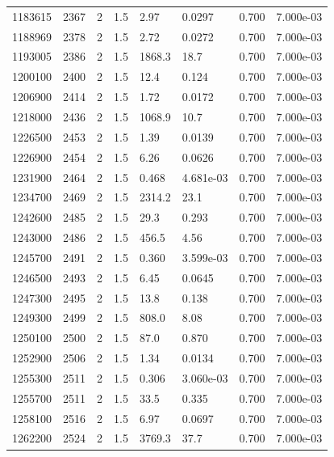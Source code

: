 \documentclass[preview]{standalone}
\begin{document}
{{{{{{{{{{{{{{{{\begin{tabular}{L{1.2cm}C{1.2cm} C{0.3cm}C{0.5cm} C{1.4cm}C{1.4cm} C{1.4cm}C{1.4cm}}
  1183615  &  2367  & 2     & 1.5 &  2.97  & 0.0297  & 0.700 &  7.000e-03   \\ 
  1188969  &  2378  & 2     & 1.5 &  2.72  & 0.0272  & 0.700 &  7.000e-03   \\ 
  1193005  &  2386  & 2     & 1.5 &  1868.3  & 18.7  & 0.700 &  7.000e-03   \\ 
  1200100  &  2400  & 2     & 1.5 &  12.4  & 0.124  & 0.700 &  7.000e-03   \\ 
  1206900  &  2414  & 2     & 1.5 &  1.72  & 0.0172  & 0.700 &  7.000e-03   \\ 
  1218000  &  2436  & 2     & 1.5 &  1068.9  & 10.7  & 0.700 &  7.000e-03   \\ 
  1226500  &  2453  & 2     & 1.5 &  1.39  & 0.0139  & 0.700 &  7.000e-03   \\ 
  1226900  &  2454  & 2     & 1.5 &  6.26  & 0.0626  & 0.700 &  7.000e-03   \\ 
  1231900  &  2464  & 2     & 1.5 &  0.468  & 4.681e-03  & 0.700 &  7.000e-03   \\ 
  1234700  &  2469  & 2     & 1.5 &  2314.2  & 23.1  & 0.700 &  7.000e-03   \\ 
  1242600  &  2485  & 2     & 1.5 &  29.3  & 0.293  & 0.700 &  7.000e-03   \\ 
  1243000  &  2486  & 2     & 1.5 &  456.5  & 4.56  & 0.700 &  7.000e-03   \\ 
  1245700  &  2491  & 2     & 1.5 &  0.360  & 3.599e-03  & 0.700 &  7.000e-03   \\ 
  1246500  &  2493  & 2     & 1.5 &  6.45  & 0.0645  & 0.700 &  7.000e-03   \\ 
  1247300  &  2495  & 2     & 1.5 &  13.8  & 0.138  & 0.700 &  7.000e-03   \\ 
  1249300  &  2499  & 2     & 1.5 &  808.0  & 8.08  & 0.700 &  7.000e-03   \\ 
  1250100  &  2500  & 2     & 1.5 &  87.0  & 0.870  & 0.700 &  7.000e-03   \\ 
  1252900  &  2506  & 2     & 1.5 &  1.34  & 0.0134  & 0.700 &  7.000e-03   \\ 
  1255300  &  2511  & 2     & 1.5 &  0.306  & 3.060e-03  & 0.700 &  7.000e-03   \\ 
  1255700  &  2511  & 2     & 1.5 &  33.5  & 0.335  & 0.700 &  7.000e-03   \\ 
  1258100  &  2516  & 2     & 1.5 &  6.97  & 0.0697  & 0.700 &  7.000e-03   \\ 
  1262200  &  2524  & 2     & 1.5 &  3769.3  & 37.7  & 0.700 &  7.000e-03   \\ 

\end{tabular}}}}}}}}}}}}}}}}}
\end{document}
